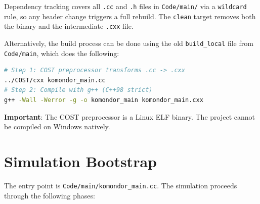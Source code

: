 \documentclass[11pt,a4paper]{article}
\begin{document}
Dependency tracking covers all \texttt{.cc} and \texttt{.h} files in \texttt{Code/main/} via a \texttt{wildcard} rule, so any header change triggers a full rebuild. The \texttt{clean} target removes both the binary and the intermediate \texttt{.cxx} file.

Alternatively, the build process can be done using the old \texttt{build\_local} file from \texttt{Code/main}, which does the following:

\begin{lstlisting}[language=bash,caption={Build steps with build\_local (Linux only)}]
# Step 1: COST preprocessor transforms .cc -> .cxx
../COST/cxx komondor_main.cc
# Step 2: Compile with g++ (C++98 strict)
g++ -Wall -Werror -g -o komondor_main komondor_main.cxx
\end{lstlisting}

\textbf{Important}: The COST preprocessor is a Linux ELF binary.  The project cannot be compiled on Windows natively.

\section{Simulation Bootstrap}
\label{sec:bootstrap}

The entry point is \texttt{Code/main/komondor\_main.cc}.  The simulation proceeds through the following phases:
\end{document}
